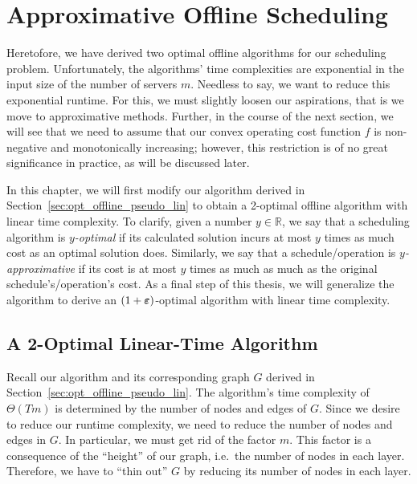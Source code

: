 
\chapter{Approximative Offline Scheduling}\label{chap:approx_offline_scheduling}
Heretofore, we have derived two optimal offline algorithms for our scheduling problem. Unfortunately, the algorithms' time complexities are exponential in the input size of the number of servers $m$. Needless to say, we want to reduce this exponential runtime. For this, we must slightly loosen our aspirations, that is we move to approximative methods. 
Further, in the course of the next section, we will see that we need to assume that our convex operating cost function $f$ is non-negative and monotonically increasing; however, this restriction is of no great significance in practice, as will be discussed later.

In this chapter, we will first modify our algorithm derived in Section~\ref{sec:opt_offline_pseudo_lin} to obtain a 2-optimal offline algorithm with linear time complexity. To clarify, given a number $y\in\mathbb{R}$, we say that a scheduling algorithm is \emph{$y$-optimal} if its calculated solution incurs at most $y$ times as much cost as an optimal solution does. Similarly, we say that a schedule/operation is \emph{$y$-approximative} if its cost is at most $y$ times as much as much as the original schedule's/operation's cost.
As a final step of this thesis, we will generalize the  algorithm to derive an $(1+\boldsymbol\varepsilon)$-optimal algorithm with linear time complexity.

\section{A 2-Optimal Linear-Time Algorithm}\label{sec:approx_2_opt}
Recall our algorithm and its corresponding graph $G$ derived in Section~\ref{sec:opt_offline_pseudo_lin}. The algorithm's time complexity of $\Theta(Tm)$ is determined by the number of nodes and edges of $G$. Since we desire to reduce our runtime complexity, we need to reduce the number of nodes and edges in $G$. In particular, we must get rid of the factor $m$. This factor is a consequence of the ``height'' of our graph, i.e.\ the number of nodes in each layer. Therefore, we have to ``thin out'' $G$ by reducing its number of nodes in each layer.

